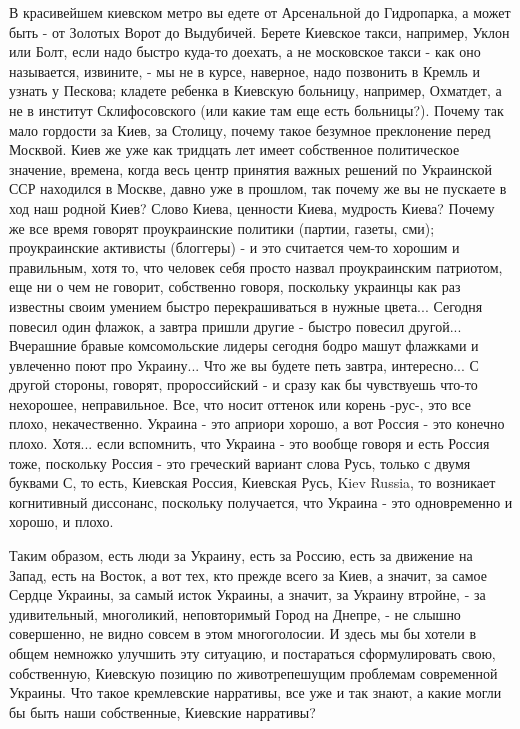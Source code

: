 В красивейшем киевском метро вы
едете от Арсенальной до Гидропарка, а может быть - от Золотых Ворот до
Выдубичей. Берете Киевское такси, например, Уклон или Болт, если надо быстро
куда-то доехать, а не московское такси - как оно называется, извините, - мы не
в курсе, наверное, надо позвонить в Кремль и узнать у Пескова; кладете ребенка
в Киевскую больницу, например, Охматдет, а не в институт Склифосовского (или
какие там еще есть больницы?). Почему так мало гордости за Киев, за Столицу,
почему такое безумное преклонение перед Москвой.  Киев же уже как тридцать лет
имеет собственное политическое значение, времена, когда весь центр принятия
важных решений по Украинской ССР находился в Москве, давно уже в прошлом, так
почему же вы не пускаете в ход наш родной Киев? Слово Киева, ценности Киева,
мудрость Киева? Почему же все время говорят проукраинские политики (партии,
газеты, сми); проукраинские активисты (блоггеры) - и это считается чем-то
хорошим и правильным, хотя то, что человек себя просто назвал проукраинским
патриотом, еще ни о чем не говорит, собственно говоря, поскольку украинцы как
раз известны своим умением быстро перекрашиваться в нужные цвета... Сегодня
повесил один флажок, а завтра пришли другие - быстро повесил другой...
Вчерашние бравые комсомольские лидеры сегодня бодро машут флажками и увлеченно
поют про Украину... Что же вы будете петь завтра, интересно... С другой
стороны, говорят, пророссийский - и сразу как бы чувствуешь что-то нехорошее,
неправильное. Все, что носит оттенок или корень -рус-, это все плохо,
некачественно.  Украина - это априори хорошо, а вот Россия - это конечно плохо.
Хотя... если вспомнить, что Украина - это вообще говоря и есть Россия тоже,
поскольку Россия - это греческий вариант слова Русь, только с двумя буквами С,
то есть, Киевская Россия, Киевская Русь, Kiev Russia, то возникает когнитивный
диссонанс, поскольку получается, что Украина - это одновременно и хорошо, и
плохо. 

Таким образом, есть люди за Украину, есть за Россию, есть за движение на Запад,
есть на Восток, а вот тех, кто прежде всего за Киев, а значит, за самое Сердце
Украины, за самый исток Украины, а значит, за Украину втройне, - за
удивительный, многоликий, неповторимый Город на Днепре, - не слышно совершенно,
не видно совсем в этом многоголосии. И здесь мы бы хотели в общем немножко
улучшить эту ситуацию, и постараться сформулировать свою, собственную, Киевскую
позицию по животрепешущим проблемам современной Украины. Что такое кремлевские
нарративы, все уже и так знают, а какие могли бы быть наши собственные,
Киевские нарративы?

